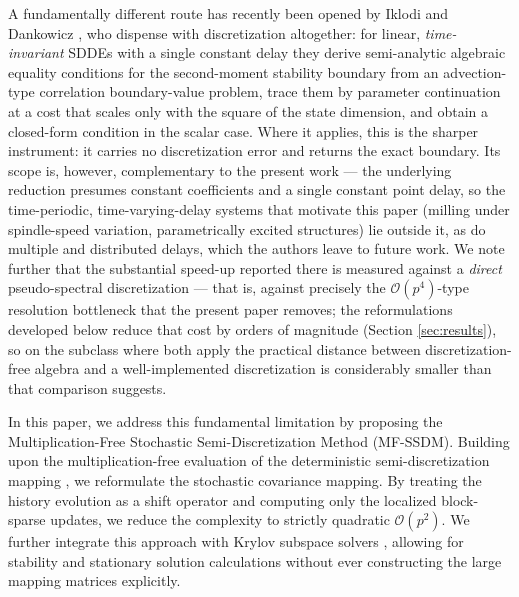 \documentclass[preprint,12pt]{elsarticle}
\begin{document}
A fundamentally different route has recently been opened by Iklodi and Dankowicz \cite{Iklodi2026}, who dispense with discretization altogether: for linear, \emph{time-invariant} SDDEs with a single constant delay they derive semi-analytic algebraic equality conditions for the second-moment stability boundary from an advection-type correlation boundary-value problem, trace them by parameter continuation at a cost that scales only with the square of the state dimension, and obtain a closed-form condition in the scalar case. Where it applies, this is the sharper instrument: it carries no discretization error and returns the exact boundary. Its scope is, however, complementary to the present work --- the underlying reduction presumes constant coefficients and a single constant point delay, so the time-periodic, time-varying-delay systems that motivate this paper (milling under spindle-speed variation, parametrically excited structures) lie outside it, as do multiple and distributed delays, which the authors leave to future work. We note further that the substantial speed-up reported there is measured against a \emph{direct} pseudo-spectral discretization --- that is, against precisely the $\mathcal{O}(p^4)$-type resolution bottleneck that the present paper removes; the reformulations developed below reduce that cost by orders of magnitude (Section \ref{sec:results}), so on the subclass where both apply the practical distance between discretization-free algebra and a well-implemented discretization is considerably smaller than that comparison suggests.

In this paper, we address this fundamental limitation by proposing the Multiplication-Free Stochastic Semi-Discretization Method (MF-SSDM). Building upon the multiplication-free evaluation of the deterministic semi-discretization mapping \cite{BachrathyMFSD}, we reformulate the stochastic covariance mapping. By treating the history evolution as a shift operator and computing only the localized block-sparse updates, we reduce the complexity to strictly quadratic $\mathcal{O}(p^2)$. We further integrate this approach with Krylov subspace solvers \cite{Saad1986, Haegeman2021}, allowing for stability and stationary solution calculations without ever constructing the large mapping matrices explicitly.
\end{document}
